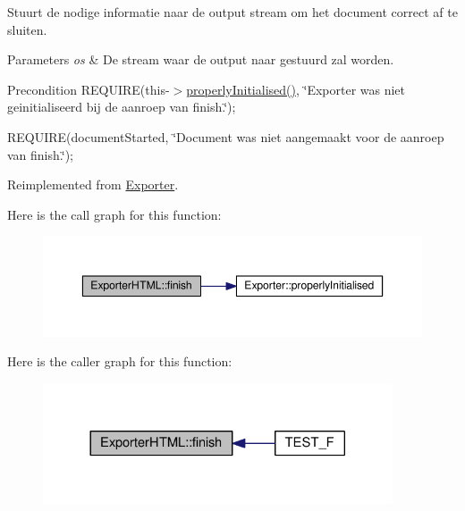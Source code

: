 Stuurt de nodige informatie naar de output stream om het document correct af te sluiten. 


\begin{DoxyParams}{Parameters}
{\em os} & De stream waar de output naar gestuurd zal worden. \\
\hline
\end{DoxyParams}
\begin{DoxyPrecond}{Precondition}
R\+E\+Q\+U\+I\+RE(this-\/$>$\hyperlink{class_exporter_af01d2a6c2f54329b1867a19537e11a34}{properly\+Initialised()}, \char`\"{}\+Exporter was niet geinitialiseerd bij de aanroep van finish.\char`\"{}); 

R\+E\+Q\+U\+I\+RE(document\+Started, \char`\"{}\+Document was niet aangemaakt voor de aanroep van finish.\char`\"{}); 
\end{DoxyPrecond}


Reimplemented from \hyperlink{class_exporter_ae477714f462d70cfc5b3970f91fcc4ed}{Exporter}.



Here is the call graph for this function\+:
\nopagebreak
\begin{figure}[H]
\begin{center}
\leavevmode
\includegraphics[width=350pt]{class_exporter_h_t_m_l_aefa1c658f3c3c55bd7725bdad09629b3_cgraph}
\end{center}
\end{figure}




Here is the caller graph for this function\+:
\nopagebreak
\begin{figure}[H]
\begin{center}
\leavevmode
\includegraphics[width=293pt]{class_exporter_h_t_m_l_aefa1c658f3c3c55bd7725bdad09629b3_icgraph}
\end{center}
\end{figure}


